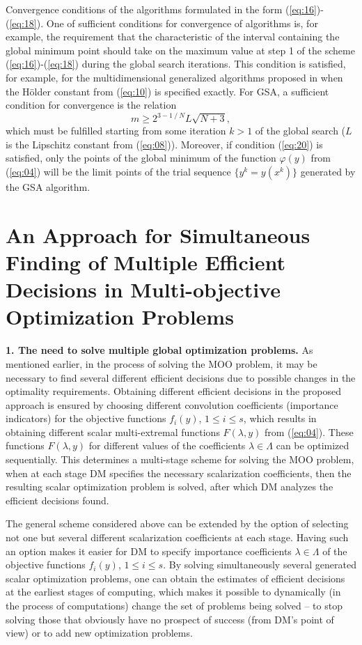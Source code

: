 \documentclass[runningheads]{llncs}
\begin{document}
Convergence conditions of the algorithms formulated in the form (\ref{eq:16})-(\ref{eq:18}). One of sufficient conditions for convergence of algorithms is, for example, the requirement that the characteristic of the interval containing the global minimum point should take on the maximum value at step 1 of the scheme (\ref{eq:16})-(\ref{eq:18}) during the global search iterations. This condition is satisfied, for example, for the multidimensional generalized algorithms proposed in \cite{c22,c23} when the H{\"o}lder constant from (\ref{eq:10}) is specified exactly. For GSA, a sufficient condition for convergence is the relation \cite{c15}
\begin{equation}
\label{eq:20}
m \geq 2^{3-1⁄N} L\sqrt{N+3},
\end{equation}
which must be fulfilled starting from some iteration $k>1$ of the global search ($L$ is the Lipschitz constant from (\ref{eq:08})). Moreover, if condition (\ref{eq:20}) is satisfied, only the points of the global minimum of the function $\varphi(y)$ from (\ref{eq:04}) will be the limit points of the trial sequence $\{y^k=y(x^k)\}$ generated by the GSA algorithm.

\section{An Approach for Simultaneous Finding of Multiple Efficient Decisions in Multi-objective Optimization Problems} \label{sec:04}

\textbf{1. The need to solve multiple global optimization problems.} As mentioned earlier, in the process of solving the MOO problem, it may be necessary to find several different efficient decisions due to possible changes in the optimality requirements. Obtaining different efficient decisions in the proposed approach is ensured by choosing different convolution coefficients (importance indicators) for the objective functions $f_i(y)$, $1 \leq i \leq s$, which results in obtaining different  scalar multi-extremal functions $F(\lambda, y)$ from (\ref{eq:04}). These functions $F(\lambda, y)$ for different values of the coefficients $\lambda \in \Lambda$ can be optimized sequentially. This determines a multi-stage scheme for solving the MOO problem, when at each stage DM specifies the necessary scalarization coefficients, then the resulting scalar optimization problem is solved, after which DM analyzes the efficient decisions found. 

The general scheme considered above can be extended by the option of selecting not one but several different scalarization coefficients at each stage. Having such an option makes it easier for DM  to specify importance coefficients $\lambda \in \Lambda$ of the objective functions $f_i(y)$, $1 \leq i \leq s$. By solving simultaneously several generated scalar optimization problems, one can  obtain the estimates of efficient decisions at the earliest stages of computing, which makes it possible to dynamically (in the process of computations) change the set of problems being solved -- to stop solving those that obviously have no prospect of success (from DM's point of view) or to add new optimization problems. 
\end{document}
